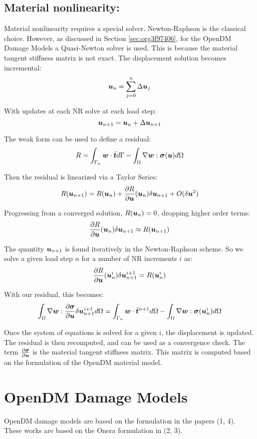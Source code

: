 \documentclass[11pt]{article}
\begin{document}
\subsection{Material nonlinearity:}
\label{sec:org7e11a1a}
Material nonlinearity requires a special solver. Newton-Raphson is the
classical choice. However, as discussed in Section \ref{sec:org3f97406}, for the OpenDM Damage Models a
Quasi-Newton solver is used. This is because the material tangent stiffness
matrix is not exact. The displacement solution becomes incremental:
\[
\bm{u}_n = \sum_{j=0}^{n} \Delta \bm{u}_j
\]

With updates at each NR solve at each load step:
\[
\bm{u}_{n+1} = \bm{u}_n + \Delta \bm{u}_{n+1}
\]

The weak form can be used to define a residual:
\[
R = 
\int_{\Gamma_n} \bm{w} \cdot \bar{\bm{t}} d\Gamma -
\int_{\Omega} \nabla \bm{w} : \bm{\sigma} (\bm{u}) d\Omega
\]

Then the residual is linearized via a Taylor Series:
\[
R (\bm{u}_{n+1}) = R (\bm{u}_{n}) +
\frac{\partial R}{\partial \bm{u}} (\bm{u}_{n})
\delta \bm{u}_{n+1} +
O(\delta \bm{u}^2)
\]

Progressing from a converged solution, \(R(\bm{u}_n) = 0\), dropping
higher order terms:
\[
\frac{\partial R}{\partial \bm{u}}(\bm{u}_n) \delta \bm{u}_{n+1} \approx 
R (\bm{u}_{n+1})
\]

The quantity \(\bm{u}_{n+1}\) is found iteratively in the Newton-Raphson
scheme. So we solve a given load step \(n\) for a number of NR
increments \(i\) as:
\[
\frac{\partial R}{\partial \bm{u}} (\bm{u}_n^i) \delta \bm{u}_{n+1}^{i+1} =
R (\bm{u}_{n}^{i})
\]

With our residual, this becomes:
\[
\int_{\Omega} \nabla \bm{w} : \frac{\partial \bm{\sigma}}{\partial \bm{u}}
\delta \bm{u}_{n+1}^{i+1} d\Omega =
\int_{\Gamma_n} \bm{w} \cdot \bar{\bm{t}}^{n+1} d\Omega -
\int_{\Omega} \nabla \bm{w} : \bm{\sigma} (\bm{u}_{n}^i) d\Omega 
\]

Once the system of equations is solved for a given \(i\), the
displacement is updated. The residual is then recomputed, and can be
used as a convergence check. The term \(\frac{\partial
\bm{\sigma}}{\partial \bm{u}}\) is the material tangent stiffness
matrix. This matrix is computed based on the formulation of the OpenDM
material model.

\section{OpenDM Damage Models}
\label{sec:org25fcd9c}
OpenDM damage models are based on the formulation in the papers
(1, 4). These works are
based on the Onera formulation in (2, 3).
\end{document}
